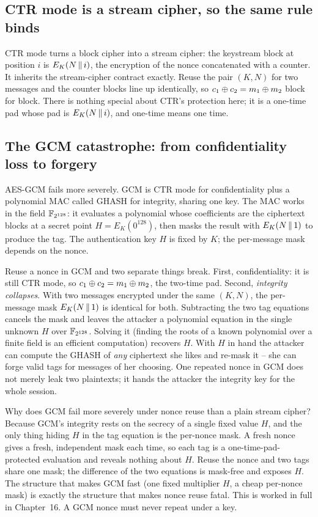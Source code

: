 \subsection{CTR mode is a stream cipher, so the same rule binds}
\label{ch38:ctr-nonce}

CTR mode turns a block cipher into a stream cipher: the keystream block at position $i$ is $E_K(N \,\|\, i)$, the encryption of the nonce concatenated with a counter. It inherits the stream-cipher contract exactly. Reuse the pair $(K, N)$ for two messages and the counter blocks line up identically, so $c_1 \oplus c_2 = m_1 \oplus m_2$ block for block. There is nothing special about CTR's protection here; it is a one-time pad whose pad is $E_K(N\,\|\, i)$, and one-time means one time.

\subsection{The GCM catastrophe: from confidentiality loss to forgery}
\label{ch38:gcm-nonce}

AES-GCM fails more severely. GCM is CTR mode for confidentiality plus a polynomial MAC called GHASH for integrity, sharing one key. The MAC works in the field $\mathbb{F}_{2^{128}}$: it evaluates a polynomial whose coefficients are the ciphertext blocks at a secret point $H = E_K(0^{128})$, then masks the result with $E_K(N \,\|\, 1)$ to produce the tag. The authentication key $H$ is fixed by $K$; the per-message mask depends on the nonce.

Reuse a nonce in GCM and two separate things break. First, confidentiality: it is still CTR mode, so $c_1 \oplus c_2 = m_1 \oplus m_2$, the two-time pad. Second, \emph{integrity collapses}. With two messages encrypted under the same $(K,N)$, the per-message mask $E_K(N\,\|\, 1)$ is identical for both. Subtracting the two tag equations cancels the mask and leaves the attacker a polynomial equation in the single unknown $H$ over $\mathbb{F}_{2^{128}}$. Solving it (finding the roots of a known polynomial over a finite field is an efficient computation) recovers $H$. With $H$ in hand the attacker can compute the GHASH of \emph{any} ciphertext she likes and re-mask it -- she can forge valid tags for messages of her choosing. One repeated nonce in GCM does not merely leak two plaintexts; it hands the attacker the integrity key for the whole session.

\begin{whybox}
Why does GCM fail more severely under nonce reuse than a plain stream cipher? Because GCM's integrity rests on the secrecy of a single fixed value $H$, and the only thing hiding $H$ in the tag equation is the per-nonce mask. A fresh nonce gives a fresh, independent mask each time, so each tag is a one-time-pad-protected evaluation and reveals nothing about $H$. Reuse the nonce and two tags share one mask; the difference of the two equations is mask-free and exposes $H$. The structure that makes GCM fast (one fixed multiplier $H$, a cheap per-nonce mask) is exactly the structure that makes nonce reuse fatal. This is worked in full in Chapter~16. A GCM nonce must never repeat under a key.
\end{whybox}

